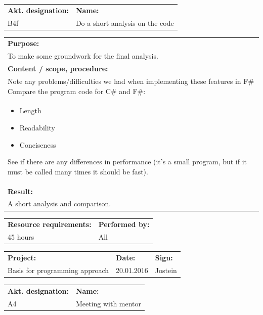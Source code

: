 \documentclass[12pt, a4paper]{article}
\begin{document}
\begin{tabularx}{\textwidth}{|p{40mm}|X|}
	\textbf{Akt. designation:}&\textbf{Name:}\\
	B4f&Do a short analysis on the code  \\
	\hline
\end{tabularx}

\begin{tabularx}{\textwidth}{|X|}
	\textbf{Purpose:}\\
	To make some groundwork for the final analysis.\\
	\hline
	\textbf{Content / scope, procedure:}\\
	Note any problems/difficulties we had when implementing these features in F\#
Compare the program code for C\# and F\#: \\
	\begin{itemize}
		\item Length
		\item Readability
		\item Conciseness
	\end{itemize}
	See if there are any differences in performance (it’s a small program, but if it must be called many times it should be fast).\\
 	\hline
	\textbf{Result:}\\
	A short analysis and comparison. \\
	\hline
\end{tabularx}

\begin{tabularx}{\textwidth}{|X|p{30mm}|}
	\textbf{Resource requirements:}&\textbf{Performed by:}\\
	45 hours&All\\
	\hline
\end{tabularx}

\newpage

\begin{tabularx}{\textwidth}{|X|p{32mm}|p{20mm}|}
	\hline
	\textbf{Project:}&\textbf{Date:}&\textbf{Sign:}\\
	Basis for programming approach&20.01.2016&Jostein\\
	\hline
\end{tabularx}

\begin{tabularx}{\textwidth}{|p{40mm}|X|}
	\textbf{Akt. designation:}&\textbf{Name:}\\
	A4&Meeting with mentor  \\
	\hline
\end{tabularx}
\end{document}
